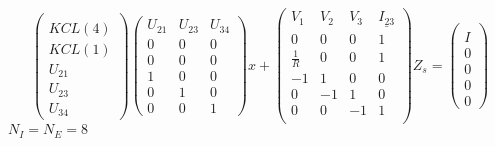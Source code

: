 \documentclass[10pt]{article}
\begin{document}
\[\left(\begin{array}{c}
  \\
KCL(4)\\KCL(1)\\U_{21}\\U_{23}\\U_{34}
\end{array}\right)
\left(\begin{array}{ccc}
  U_{21}&U_{23}&U_{34}\\
  \hline
  0&0&0\\
  0&0&0\\
  1&0&0\\
  0&1&0\\
  0&0&1
\end{array}\right)x+
\left(\begin{array}{cccc}
  V_{1}&V_{2}&V_{3}&\underline{I_{23}}\\
  \hline
  0&0&0&1\\
  \frac{1}{R}&0&0&1\\
  -1&1&0&0\\
  0&-1&1&0\\
  0&0&-1&1\\
\end{array}\right)Z_{s}=
\left(\begin{array}{c}
\\I\\0\\0\\0\\0
\end{array}\right)
\]
 $N_{I}=N_{E}=8$\\
\end{document}
